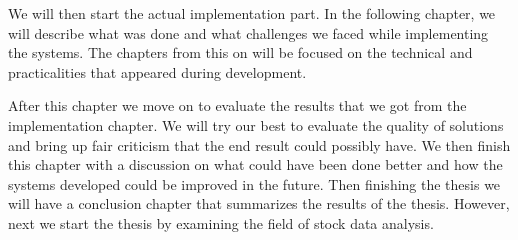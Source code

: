 We will then start the actual implementation part.
In the following chapter, we will describe what was done and what challenges we faced while implementing the systems.
The chapters from this on will be focused on the technical and practicalities that appeared during development.

After this chapter we move on to evaluate the results that we got from the implementation chapter. 
We will try our best to evaluate the quality of solutions and bring up fair criticism that the end result could possibly have.
We then finish this chapter with a discussion on what could have been done better and how the systems developed could be improved in the future.
Then finishing the thesis we will have a conclusion chapter that summarizes the results of the thesis.
However, next we start the thesis by examining the field of stock data analysis.
